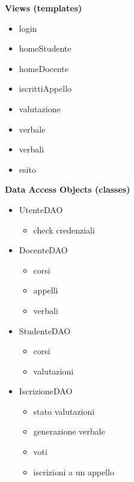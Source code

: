 \documentclass[a4paper,12pt]{scrreprt}
\begin{document}
\begin{minipage}[t]{0.48\textwidth}
\textbf{Views (templates)}
\begin{itemize}
    \item login
    \item homeStudente
    \item homeDocente
    \item iscrittiAppello
    \item valutazione
    \item verbale
    \item verbali
    \item esito
\end{itemize}
\textbf{Data Access Objects (classes)}
\begin{itemize}
    \item UtenteDAO
    \begin{itemize}
            \item check credenziali 
    \end{itemize}
    \item DocenteDAO
    \begin{itemize}
            \item corsi
            \item appelli
            \item verbali
    \end{itemize}
    \item StudenteDAO
    \begin{itemize}
            \item corsi
            \item valutazioni
        \end{itemize}
    \item IscrizioneDAO
    \begin{itemize}
            \item stato valutazioni
            \item generazione verbale
            \item voti
            \item iscrizioni a un appello
    \end{itemize}
\end{itemize}
\end{minipage}
\end{document}
